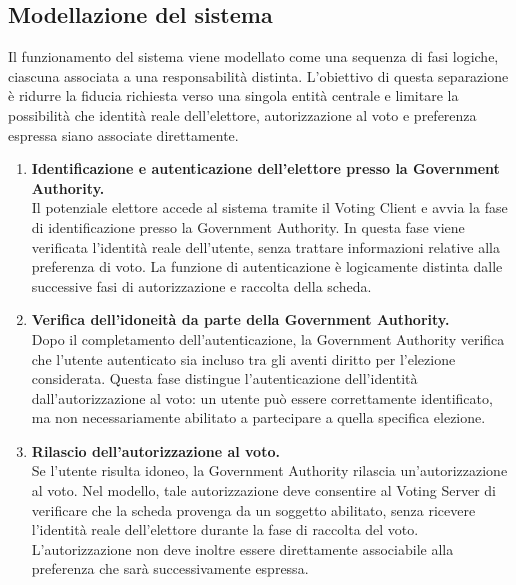 \documentclass[a4paper,12pt]{article}
\begin{document}
    \subsection{Modellazione del sistema}

    Il funzionamento del sistema viene modellato come una sequenza di fasi logiche, ciascuna associata a una responsabilità distinta. 
    L'obiettivo di questa separazione è ridurre la fiducia richiesta verso una singola entità centrale e limitare la possibilità che identità reale dell'elettore, autorizzazione al voto e preferenza espressa siano associate direttamente.

        \begin{enumerate}

            \item \textbf{Identificazione e autenticazione dell'elettore presso la Government Authority.}\\
            Il potenziale elettore accede al sistema tramite il Voting Client e avvia la fase di
            identificazione presso la Government Authority. In questa fase viene verificata
            l'identità reale dell'utente, senza trattare informazioni relative alla preferenza di
            voto. La funzione di autenticazione è logicamente distinta dalle successive fasi di
            autorizzazione e raccolta della scheda.

            \item \textbf{Verifica dell'idoneità da parte della Government Authority.}\\
            Dopo il completamento dell'autenticazione, la Government Authority verifica che
            l'utente autenticato sia incluso tra gli aventi diritto per l'elezione considerata.
            Questa fase distingue l'autenticazione dell'identità dall'autorizzazione al voto:
            un utente può essere correttamente identificato, ma non necessariamente abilitato
            a partecipare a quella specifica elezione.
            \item \textbf{Rilascio dell'autorizzazione al voto.}\\
            Se l'utente risulta idoneo, la Government Authority rilascia un'autorizzazione al voto. 
            Nel modello, tale autorizzazione deve consentire al Voting Server di verificare che la scheda provenga da un soggetto abilitato, senza ricevere l'identità reale dell'elettore durante la fase di raccolta del voto. 
            L'autorizzazione non deve inoltre essere direttamente associabile alla preferenza che sarà successivamente espressa.


\end{enumerate}
\end{document}
